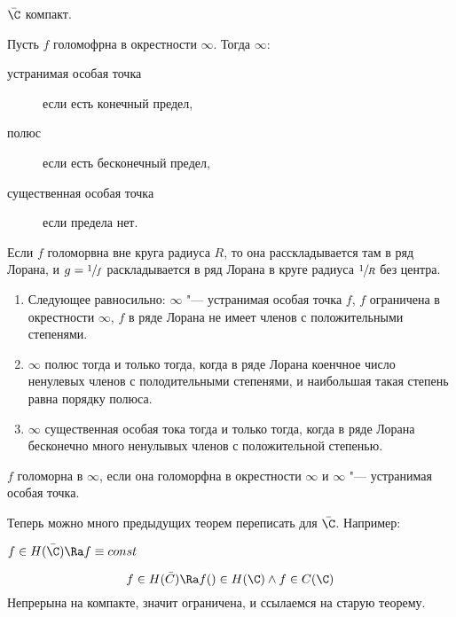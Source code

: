 \begin{conseq}
	$\bar \C$ компакт.
\end{conseq}

\begin{Def}
	Пусть $f$ голомофрна в окрестности $\infty$.
	Тогда $\infty$:
	\begin{description}
		\item[устранимая особая точка] если есть конечный предел,
		\item[полюс] если есть бесконечный предел,
		\item[существенная особая точка] если предела нет.
	\end{description}
\end{Def}

\begin{Rem}
	Если $f$ голоморвна вне круга радиуса $R$, то она расскладывается там в ряд Лорана,
	и $g = \sfrac1f$ раскладывается в ряд Лорана в круге радиуса $\sfrac1R$ без центра.
\end{Rem}

\begin{theorem}\begin{enumerate}
\item
	Следующее равносильно:
	$\infty$ "--- устранимая особая точка $f$,
	$f$ ограничена в окрестности $\infty$,
	$f$ в ряде Лорана не имеет членов с положительными степенями.

\item
	$\infty$ полюс тогда и только тогда, когда в ряде Лорана коенчное число ненулевых членов с полодительными степенями,
	и наибольшая такая степень равна порядку полюса.

\item
	$\infty$ существенная особая тока тогда и только тогда, когда в ряде Лорана бесконечно много ненулывых членов с положительной степенью.
\end{enumerate}\end{theorem}

\begin{Def}
	$f$ голоморна в $\infty$, если она голоморфна в окрестности $\infty$ и $\infty$ "--- устранимая особая точка.
\end{Def}

Теперь можно много предыдущих теорем переписать для $\bar \C$.
Например:

\begin{theorem}[Лиувилля]
	$f \in H(\bar \C) \Ra f \equiv const$
\end{theorem}
\begin{Def}
	\[ f \in H(\bar C) \Ra f() \in H(\C) \land f \in C(\C) \]
	Непрерына на компакте, значит ограничена, и ссылаемся на старую теорему.
\end{Def}

